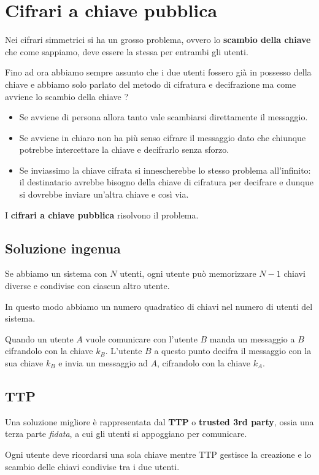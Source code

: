 \chapter{Cifrari a chiave pubblica}
Nei cifrari simmetrici si ha un grosso problema, ovvero lo \textbf{scambio della chiave} che come sappiamo, deve
essere la stessa per entrambi gli utenti.

Fino ad ora abbiamo sempre assunto che i due utenti fossero gi\`a in possesso della chiave e abbiamo solo parlato del
metodo di cifratura e decifrazione ma come avviene lo scambio della chiave ?
\begin{itemize}
	\item Se avviene di persona allora tanto vale scambiarsi direttamente il messaggio.
	\item Se avviene in chiaro non ha pi\`u senso cifrare il messaggio dato che chiunque potrebbe intercettare la
	      chiave e decifrarlo senza sforzo.
	\item Se inviassimo la chiave cifrata si innescherebbe lo stesso problema all'infinito: il destinatario avrebbe
	      bisogno della chiave di cifratura per decifrare e dunque si dovrebbe inviare un'altra chiave e cos\`i via.
\end{itemize}
I \textbf{cifrari a chiave pubblica} risolvono il problema.

\section{Soluzione ingenua}
Se abbiamo un sistema con $N$ utenti, ogni utente pu\`o memorizzare $N-1$ chiavi diverse e condivise con ciascun altro
utente.

In questo modo abbiamo un numero quadratico di chiavi nel numero di utenti del sistema.

Quando un utente $A$ vuole comunicare con l'utente $B$ manda un messaggio a $B$ cifrandolo con la chiave $k_B$.
L'utente $B$ a questo punto decifra il messaggio con la sua chiave $k_B$ e invia un messaggio ad $A$, cifrandolo con
la chiave $k_A$.

\section{TTP}
Una soluzione migliore \`e rappresentata dal \textbf{TTP} o \textbf{trusted 3rd party}, ossia una terza parte
\emph{fidata}, a cui gli utenti si appoggiano per comunicare.

Ogni utente deve ricordarsi una sola chiave mentre TTP gestisce la creazione e lo scambio delle chiavi condivise tra i
due utenti.


